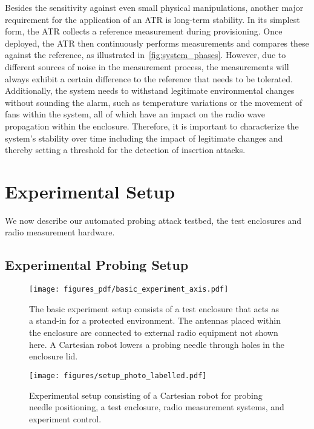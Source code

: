 \documentclass[conference]{IEEEtran}
\begin{document}
Besides the sensitivity against even small physical manipulations, another major requirement for the application of an ATR is long-term stability. In its simplest form, the ATR collects a reference measurement during provisioning. Once deployed, the ATR then continuously performs measurements and compares these against the reference, as illustrated in~\autoref{fig:system_phases}. However, due to different sources of noise in the measurement process, the measurements will always exhibit a certain difference to the reference that needs to be tolerated. Additionally, the system needs to withstand legitimate environmental changes without sounding the alarm, such as temperature variations or the movement of fans within the system, all of which have an impact on the radio wave propagation within the enclosure. Therefore, it is important to characterize the system's stability over time including the impact of legitimate changes and thereby setting a threshold for the detection of insertion attacks.

 
\section{Experimental Setup}

We now describe our automated probing attack testbed, the test enclosures and radio measurement hardware.

\subsection{Experimental Probing Setup}
\begin{figure}
\centering
\texttt{[image: figures\_pdf/basic\_experiment\_axis.pdf]}
\caption{The basic experiment setup consists of a test enclosure that acts as a stand-in for a protected environment. The antennas placed within the enclosure are connected to external radio equipment not shown here. A Cartesian robot lowers a probing needle through holes in the enclosure lid. }
\label{fig:exp_render}
\end{figure}

\begin{figure}
\centering
\texttt{[image: figures/setup\_photo\_labelled.pdf]}
\caption{Experimental setup consisting of a Cartesian robot for probing needle positioning, a test enclosure, radio measurement systems, and experiment control.}
\label{fig:experimental_setup}
\end{figure}
\end{document}

